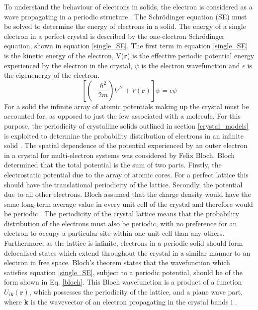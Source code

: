 \documentclass[11pt, twoside]{report}
\begin{document}
To understand the behaviour of electrons in solids, the electron is considered as a wave propagating in a periodic structure \cite{small_semiconductor1}. The Schr{\"o}dinger equation (SE) must be solved to determine the energy of electrons in a solid. 
The energy of a single electron in a perfect crystal is described by the one-electron Schr{\"o}dinger equation, shown in equation \ref{single_SE}. The first term in equation \ref{single_SE} is the kinetic energy of the electron, V(\textbf{r}) is the effective periodic potential energy experienced by the electron in the crystal, $\psi$ is the electron wavefunction and $\epsilon$ is the eigenenergy of the electron.
\begin{equation} \label{single_SE}
\left[ \left(-\frac{\hbar^2}{2m}\right)\nabla^2 + V(\mathbf{r})\right]\psi = \epsilon \psi 
\end{equation}
For a solid the infinite array of atomic potentials making up the crystal must be accounted for, as opposed to just the few associated with a molecule. For this purpose, the periodicity of crystalline solids outlined in section \ref{crystal_models} is exploited to determine the probability distribution of electrons in an infinite solid \cite{Nelson3}. 
The spatial dependence of the potential experienced by an outer electron in a crystal for multi-electron systems was considered by Felix Bloch. Bloch determined that the total potential is the sum of two parts. Firstly, the electrostatic potential due to the array of atomic cores. For a perfect lattice this should have the translational periodicity of the lattice. Secondly, the potential due to all other electrons. Bloch assumed that the charge density would have the same long-term average value in every unit cell of the crystal and therefore would be periodic \cite{fund_semi}.
The periodicity of the crystal lattice means that the probability distribution of the electrons must also be periodic, with no preference for an electron to occupy a particular site within one unit cell than any others. Furthermore, as the lattice is infinite, electrons in a periodic solid should form delocalised states which extend throughout the crystal in a similar manner to an electron in free space.
Bloch's theorem states that the wavefunction which satisfies equation \ref{single_SE}, subject to a periodic potential, should be of the form shown in Eq. \ref{bloch}. This Bloch wavefunction is a product of a function $U_{i\mathbf{k}}(\mathbf{r})$, which possesses the periodicity of the lattice, and a plane wave part, where \textbf{k} is the wavevector of an electron propagating in the crystal bands i \cite{Nelson3}.
\end{document}
